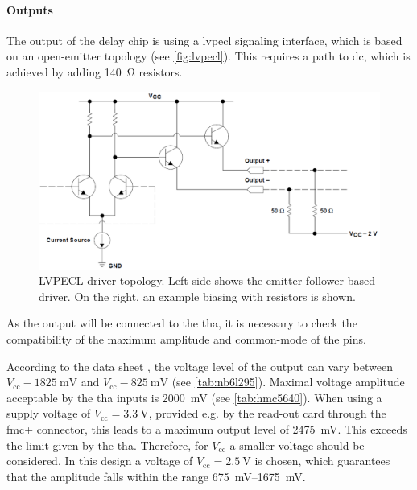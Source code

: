 \paragraph{Outputs}
The output of the delay chip is using a \gls{lvpecl} signaling interface, which is based on an open-emitter topology (see \autoref{fig:lvpecl}).
This requires a path to \gls{dc}, which is achieved by adding \SI{140}{\ohm} resistors.

\begin{figure}[tbh]
	\centering
	\includegraphics[width = \textwidth]{chap/04-work/img/lvpecl}
	\caption[LVPECL driver topology]{LVPECL driver topology. Left side shows the emitter-follower based driver. On the right, an example biasing with resistors is shown. \cite{lvpecl}}
	\label{fig:lvpecl}
\end{figure}

As the output will be connected to the \gls{tha}, it is necessary to check the compatibility of the maximum amplitude and common-mode of the pins.

According to the data sheet \cite{NB6L295}, the voltage level of the output can vary between  $V_\text{cc} - \SI{1825}{\milli\volt}$ and $V_\text{cc} - \SI{825}{\milli\volt}$ (see \autoref{tab:nb6l295}).
Maximal voltage amplitude acceptable by the \gls{tha} inputs is \SI{2000}{\milli\volt} (see \autoref{tab:hmc5640}).
When using a supply voltage of $V_\text{cc} = \SI{3.3}{\volt}$, provided e.g. by the read-out card through the \gls{fmc}+ connector, this leads to a maximum output level of \SI{2475}{\milli\volt}.
This exceeds the limit given by the \gls{tha}.
Therefore, for $V_\text{cc}$ a smaller voltage should be considered.
In this design a voltage of $V_\text{cc} = \SI{2.5}{\volt}$ is chosen, which guarantees that the amplitude falls within the range \SIrange{675}{1675}{\milli\volt}.

